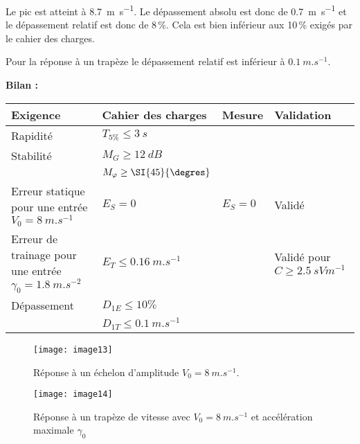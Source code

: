 \ifprof
\begin{corrige}
Le pic est atteint à \SI{8,7}{m.s^{-1}}. Le dépassement absolu est donc de \SI{0,7}{m.s^{-1}} et le dépassement relatif est donc de 8\,\%. Cela est bien inférieur aux 10\,\% exigés par le cahier des charges. 

Pour la réponse à un trapèze le dépassement relatif est inférieur à $\SI{0,1}{m.s^{-1}}$.


\textbf{Bilan :}
\begin{center}
\begin{tabular}{p{5cm}llp{3cm}}
\hline
Exigence & Cahier des charges & Mesure& Validation  \\
\hline
Rapidité & $T_{5\%}\leq \SI{3}{s}$ & & \\
Stabilité & $M_G\geq\SI{12}{dB}$ & & \\
	& $M_{\varphi} \geq\SI{45}{\degres}$ & & \\
Erreur statique pour une entrée $V_0 = \SI{8}{m.s^{-1}}$ & $E_S=0$ & $E_S=0$ & Validé \\
Erreur de trainage pour une entrée $\gamma_0 = \SI{1,8}{m.s^{-2}}$ & $E_T\leq \SI{0,16}{m.s^{-1}}$ &  & Validé pour  $C\geq  \SI{2,5}{sVm^{-1}}$\\
Dépassement & $D_{1E} \leq 10\%$ & & \\
		   & $D_{1T} \leq \SI{0,1}{m.s^{-1}}$ & & \\
\hline
\end{tabular}
\end{center} 

\end{corrige}
\else
\fi

\begin{figure}[!h]
\centering
\texttt{[image: image13]}
\caption{\label{fig:CCMP:2021:13} Réponse à un échelon d’amplitude $V_0=\SI{8}{m.s^{-1}}$.}
\end{figure} 
 
\begin{figure}[!h]
\centering
\texttt{[image: image14]}
\caption{\label{fig:CCMP:2021:14} Réponse à un trapèze de vitesse avec $V_0=\SI{8}{m.s^{-1}}$ et accélération maximale $\gamma_0$}
\end{figure} 

